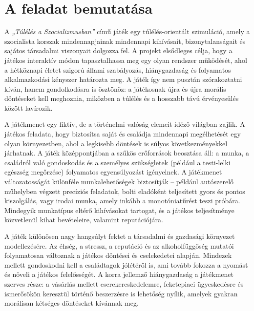 \documentclass[12pt,a4paper]{article}
\begin{document}


\newpage

\pagestyle{empty}

\cleardoublepage
{}
\tableofcontents
\cleardoublepage
{}

\newpage

\pagestyle{fancy}

\section{A feladat bemutatása}

A \emph{„Túlélés a Szocializmusban”} című játék egy túlélés-orientált szimuláció, amely a szocialista korszak mindennapjainak mindennapi kihívásait, bizonytalanságait és sajátos társadalmi viszonyait dolgozza fel. A projekt elsődleges célja, hogy a játékos interaktív módon tapasztalhassa meg egy olyan rendszer működését, ahol a hétköznapi életet szigorú állami szabályozás, hiánygazdaság és folyamatos alkalmazkodási kényszer határozta meg. A játék így nem pusztán szórakoztatni kíván, hanem gondolkodásra is ösztönöz: a játékosnak újra és újra morális döntéseket kell meghoznia, miközben a túlélés és a hosszabb távú érvényesülés között lavírozik.

A játékmenet egy fiktív, de a történelmi valóság elemeit idéző világban zajlik. A játékos feladata, hogy biztosítsa saját és családja mindennapi megélhetését egy olyan környezetben, ahol a legkisebb döntések is súlyos következményekkel járhatnak. A játék középpontjában a szűkös erőforrások beosztása áll: a munka, a családról való gondoskodás és a személyes szükségletek (például a testi-lelki egészség megőrzése) folyamatos egyensúlyozást igényelnek. A játékmenet változatosságát különféle munkalehetőségek biztosítják – például autószerelő műhelyben végzett precíziós feladatok, bolti eladóként teljesített gyors és pontos kiszolgálás, vagy irodai munka, amely inkább a monotóniatűrést teszi próbára. Mindegyik munkatípus eltérő kihívásokat tartogat, és a játékos teljesítménye közvetlenül kihat bevételeire, valamint reputációjára.

A játék különösen nagy hangsúlyt fektet a társadalmi és gazdasági környezet modellezésére. Az éhség, a stressz, a reputáció és az alkoholfüggőség mutatói folyamatosan változnak a játékos döntései és cselekedetei alapján. Mindezek mellett gondoskodni kell a családtagok jólétéről is, ami tovább fokozza a nyomást és növeli a játékos felelősségét. A korra jellemző hiánygazdaság a játékmenet szerves része: a vásárlás mellett cserekereskedelemre, feketepiaci ügyeskedésre és ismerősökön keresztül történő beszerzésre is lehetőség nyílik, amelyek gyakran morálisan kétséges döntéseket kívánnak meg.
\end{document}
